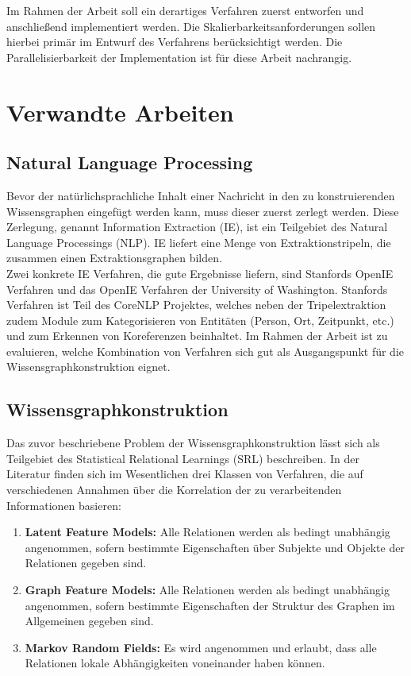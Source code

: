 \documentclass[11pt, a4paper]{scrreprt}
\begin{document}
Im Rahmen der Arbeit soll ein derartiges Verfahren zuerst entworfen und anschließend implementiert werden.
Die Skalierbarkeitsanforderungen sollen hierbei primär im Entwurf des Verfahrens berücksichtigt werden.
Die Parallelisierbarkeit der Implementation ist für diese Arbeit nachrangig.

\section{Verwandte Arbeiten}

\subsection{Natural Language Processing}

Bevor der natürlichsprachliche Inhalt einer Nachricht in den zu konstruierenden Wissensgraphen eingefügt werden kann, muss dieser zuerst zerlegt werden.
Diese Zerlegung, genannt Information Extraction (IE), ist ein Teilgebiet des Natural Language Processings (NLP).
IE liefert eine Menge von Extraktionstripeln, die zusammen einen Extraktionsgraphen bilden.\\

Zwei konkrete IE Verfahren, die gute Ergebnisse liefern, sind Stanfords OpenIE Verfahren und das OpenIE Verfahren der University of Washington.
Stanfords Verfahren ist Teil des CoreNLP Projektes, welches neben der Tripelextraktion zudem Module zum Kategorisieren von Entitäten (Person, Ort, Zeitpunkt, etc.) und zum Erkennen von Koreferenzen beinhaltet.
Im Rahmen der Arbeit ist zu evaluieren, welche Kombination von Verfahren sich gut als Ausgangspunkt für die Wissensgraphkonstruktion eignet.

\subsection{Wissensgraphkonstruktion}

Das zuvor beschriebene Problem der Wissensgraphkonstruktion lässt sich als Teilgebiet des Statistical Relational Learnings (SRL) beschreiben. In der Literatur finden sich im Wesentlichen drei Klassen von Verfahren, die auf verschiedenen Annahmen über die Korrelation der zu verarbeitenden Informationen basieren:
\begin{enumerate}
	\item \textbf{Latent Feature Models:}
		Alle Relationen werden als bedingt unabhängig angenommen, sofern bestimmte Eigenschaften über Subjekte und Objekte der Relationen gegeben sind.
	\item \textbf{Graph Feature Models:}
		Alle Relationen werden als bedingt unabhängig angenommen, sofern bestimmte Eigenschaften der Struktur des Graphen im Allgemeinen gegeben sind.
	\item \textbf{Markov Random Fields:}
		Es wird angenommen und erlaubt, dass alle Relationen lokale Abhängigkeiten voneinander haben können.
\end{enumerate}
\end{document}
